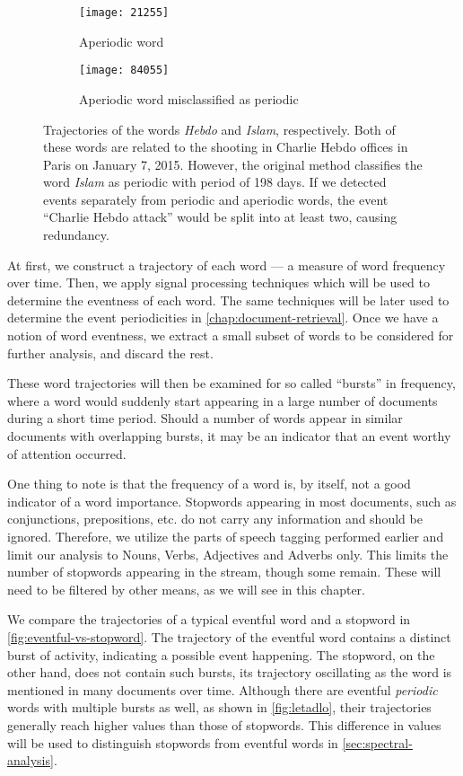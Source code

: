 \begin{figure}
\centering
\begin{subfigure}{.5\textwidth}
  \centering
  \texttt{[image: 21255]}  %
  \caption{Aperiodic word}
  \label{fig:hebdo}
\end{subfigure}%
\begin{subfigure}{.5\textwidth}
  \centering
  \texttt{[image: 84055]}  %
  \caption{Aperiodic word misclassified as periodic}
  \label{fig:islam}
\end{subfigure}
\caption{Trajectories of the words \textit{Hebdo} and \textit{Islam}, respectively. Both of these words are related to the shooting in Charlie Hebdo offices in Paris on January 7, 2015. However, the original method classifies the word \textit{Islam} as periodic with period of 198 days. If we detected events separately from periodic and aperiodic words, the event ``Charlie Hebdo attack'' would be split into at least two, causing redundancy.}
\label{fig:misclassified}
\end{figure}


At first, we construct a trajectory of each word --- a measure of word frequency over time. Then, we apply signal processing techniques which will be used to determine the eventness of each word. The same techniques will be later used to determine the event periodicities in \autoref{chap:document-retrieval}. Once we have a notion of word eventness, we extract a small subset of words to be considered for further analysis, and discard the rest.

These word trajectories will then be examined for so called ``bursts'' in frequency, where a word would suddenly start appearing in a large number of documents during a short time period. Should a number of words appear in similar documents with overlapping bursts, it may be an indicator that an event worthy of attention occurred.

One thing to note is that the frequency of a word is, by itself, not a good indicator of a word importance.
Stopwords appearing in most documents, such as conjunctions, prepositions, etc. do not carry any information and should be ignored. Therefore, we utilize the parts of speech tagging performed earlier and limit our analysis to Nouns, Verbs, Adjectives and Adverbs only. This limits the number of stopwords appearing in the stream, though some remain. These will need to be filtered by other means, as we will see in this chapter.

We compare the trajectories of a typical eventful word and a stopword in \autoref{fig:eventful-vs-stopword}. The trajectory of the eventful word contains a distinct burst of activity, indicating a possible event happening. The stopword, on the other hand, does not contain such bursts, its trajectory oscillating as the word is mentioned in many documents over time. Although there are eventful \textit{periodic} words with multiple bursts as well, as shown in \autoref{fig:letadlo}, their trajectories generally reach higher values than those of stopwords. This difference in values will be used to distinguish stopwords from eventful words in \autoref{sec:spectral-analysis}.

